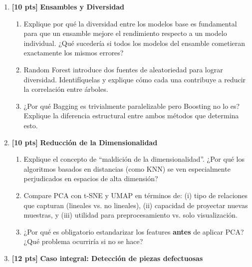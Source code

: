 \documentclass[11pt,a4paper]{article}
\newcommand{\puntaje}[1]{\textbf{[#1 pts]}}
\begin{document}
\begin{enumerate}[label=\textbf{\arabic*.}, leftmargin=*, itemsep=10pt]

\item \puntaje{10} \textbf{Ensambles y Diversidad}

\begin{enumerate}[label=\textbf{\alph*)}]
  \item Explique por qu\'e la diversidad entre los modelos base es fundamental para que un ensamble mejore el rendimiento respecto a un modelo individual. ¿Qu\'e suceder\'ia si todos los modelos del ensamble cometieran exactamente los mismos errores?
  \vspace{3.5cm}
  \item Random Forest introduce dos fuentes de aleatoriedad para lograr diversidad. Identif\'iquelas y explique c\'omo cada una contribuye a reducir la correlaci\'on entre \'arboles.
  \vspace{3.5cm}
  \item ¿Por qu\'e Bagging es trivialmente paralelizable pero Boosting no lo es? Explique la diferencia estructural entre ambos m\'etodos que determina esto.
  \vspace{3cm}
\end{enumerate}

\item \puntaje{10} \textbf{Reducci\'on de la Dimensionalidad}

\begin{enumerate}[label=\textbf{\alph*)}]
  \item Explique el concepto de ``maldici\'on de la dimensionalidad''. ¿Por qu\'e los algoritmos basados en distancias (como KNN) se ven especialmente perjudicados en espacios de alta dimensi\'on?
  \vspace{3.5cm}
  \item Compare PCA con t-SNE y UMAP en t\'erminos de: (i) tipo de relaciones que capturan (lineales vs. no lineales), (ii) capacidad de proyectar nuevas muestras, y (iii) utilidad para preprocesamiento vs. solo visualizaci\'on.
  \vspace{4cm}
  \item ¿Por qu\'e es obligatorio estandarizar los features \textbf{antes} de aplicar PCA? ¿Qu\'e problema ocurrir\'ia si no se hace?
  \vspace{3cm}
\end{enumerate}

\item \puntaje{12} \textbf{Caso integral: Detecci\'on de piezas defectuosas}


\end{enumerate}
\end{document}

